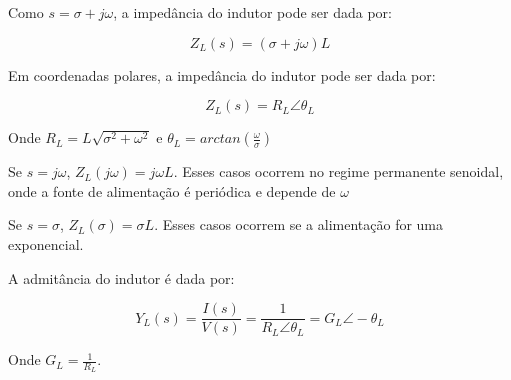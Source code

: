 \documentclass[12pt,fleqn]{book} %
\begin{document}
        Como $s = \sigma + j\omega$, a impedância do indutor pode ser dada por:
        
        \begin{equation}
        Z_L(s) = (\sigma+j\omega)L
        \end{equation}
        
        Em coordenadas polares, a impedância do indutor pode ser dada por:
        
        \begin{equation}
        Z_L(s) = R_L \angle\theta_L
        \end{equation}
        
        Onde $R_L = L\sqrt{\sigma^2+\omega^2}$ e $\theta_L = arctan(\frac{\omega}{\sigma})$
        
        \begin{remark}
        Se $s = j\omega$, $Z_L(j\omega) = j\omega L$. Esses casos ocorrem no regime permanente senoidal, onde a fonte de alimentação é periódica e depende de $\omega$
        \end{remark}
        
        \begin{remark}
        Se $s = \sigma$, $Z_L(\sigma) = \sigma L$. Esses casos ocorrem se a alimentação for uma exponencial.
        \end{remark}
        
        A admitância do indutor é dada por:
        
        \begin{equation}
        Y_L(s) = \frac{I(s)}{V(s)} = \frac{1}{R_L \angle\theta_L} = G_L \angle-\theta_L
        \end{equation}
        
        Onde $G_L = \frac{1}{R_L}$.
        
\end{document}
